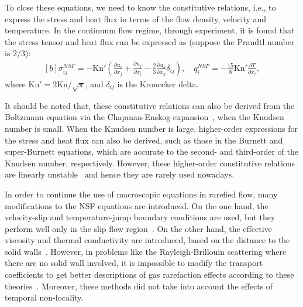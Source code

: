 \documentclass[lineno]{jfm}
\begin{document}
To close these equations, we need to know the constitutive relations, i.e., to express the stress and heat flux in terms of the flow density, velocity and temperature. In the continuum flow regime, through experiment, it is found that the stress tensor and heat flux can be expressed as (suppose the Prandtl number is $2/3$): 
\begin{equation}\label{eq11}
	\begin{aligned}[b]
		\sigma_{ij}^{NSF}  = -\text{Kn}'\left(\frac{\partial u_i}{\partial x_j}+\frac{\partial u_j}{\partial x_i}-\frac{2}{3}\frac{\partial u_k}{\partial x_k}\delta_{ij}\right),\quad
		q_i^{NSF} = -\frac{15}{8}\text{Kn}' \frac{\partial T}{\partial x_i}, 
	\end{aligned}
\end{equation}
where $\text{Kn}'=2\text{Kn}/{\sqrt{\pi}}$, and $\delta_{ij}$ is the Kronecker delta.

It should be noted that, these constitutive relations can also be derived from the Boltzmann equation via the Chapman-Enskog expansion~\citep{CE}, when the Knudsen number is small. 
When the Knudsen number is large, higher-order expressions for the stress and heat flux can also be derived, such as those in the  Burnett and super-Burnett equations, which are accurate to the second- and third-order of the Knudsen number, respectively. However, these higher-order constitutive relations are linearly unstable~\citep{Bobylev2006,GarciaColin2008} and hence they are rarely used nowadays.
	
In order to continue the use of macroscopic equations in rarefied flow, many modifications to the NSF equations are introduced.
On the one hand, the velocity-slip and temperature-jump boundary conditions are used, but they perform well only in the slip flow region~\citep{cite13}.  
On the other hand, the effective viscosity and thermal conductivity are introduced, based on the distance to the solid walls~\citep{zhang2005PRE,Dongari2012,Dongari2013PoF}. %
However, in problems like the Rayleigh-Brillouin scattering where there are no solid wall involved, it is impossible to modify the transport coefficients to get better descriptions of gas rarefaction effects according to these theories~\citep{cite8}. Moreover, these methods did not take into account the effects of temporal non-locality. 
\end{document}
